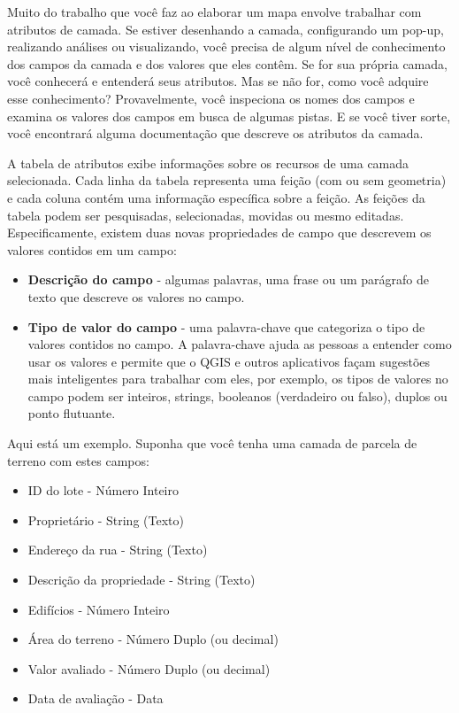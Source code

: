 \documentclass[
]{book}
\providecommand{\tightlist}{%
  \setlength{\itemsep}{0pt}\setlength{\parskip}{0pt}}
\begin{document}
Muito do trabalho que você faz ao elaborar um mapa envolve trabalhar com atributos de camada. Se estiver desenhando a camada, configurando um pop-up, realizando análises ou visualizando, você precisa de algum nível de conhecimento dos campos da camada e dos valores que eles contêm. Se for sua própria camada, você conhecerá e entenderá seus atributos. Mas se não for, como você adquire esse conhecimento? Provavelmente, você inspeciona os nomes dos campos e examina os valores dos campos em busca de algumas pistas. E se você tiver sorte, você encontrará alguma documentação que descreve os atributos da camada.

A tabela de atributos exibe informações sobre os recursos de uma camada selecionada. Cada linha da tabela representa uma feição (com ou sem geometria) e cada coluna contém uma informação específica sobre a feição. As feições da tabela podem ser pesquisadas, selecionadas, movidas ou mesmo editadas. Especificamente, existem duas novas propriedades de campo que descrevem os valores contidos em um campo:

\begin{itemize}
\tightlist
\item
  \textbf{Descrição do campo} - algumas palavras, uma frase ou um parágrafo de texto que descreve os valores no campo.
\item
  \textbf{Tipo de valor do campo} - uma palavra-chave que categoriza o tipo de valores contidos no campo. A palavra-chave ajuda as pessoas a entender como usar os valores e permite que o QGIS e outros aplicativos façam sugestões mais inteligentes para trabalhar com eles, por exemplo, os tipos de valores no campo podem ser inteiros, strings, booleanos (verdadeiro ou falso), duplos ou ponto flutuante.
\end{itemize}

Aqui está um exemplo. Suponha que você tenha uma camada de parcela de terreno com estes campos:

\begin{itemize}
\tightlist
\item
  ID do lote - Número Inteiro
\item
  Proprietário - String (Texto)
\item
  Endereço da rua - String (Texto)
\item
  Descrição da propriedade - String (Texto)
\item
  Edifícios - Número Inteiro
\item
  Área do terreno - Número Duplo (ou decimal)
\item
  Valor avaliado - Número Duplo (ou decimal)
\item
  Data de avaliação - Data
\end{itemize}
\end{document}
